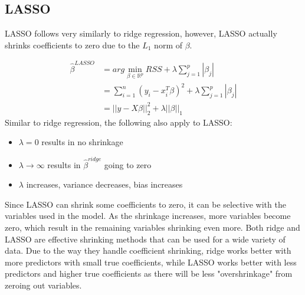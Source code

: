 \documentclass[11pt]{article}
\begin{document}
\subsection{LASSO}
LASSO follows very similarly to ridge regression, however, LASSO actually shrinks coefficients to zero due to the $L_1$ norm of $\beta$. 

\begin{align}\nonumber
\hat{\beta}^{LASSO} &= arg\min_{\beta \in \mathbb{R}^p} RSS + \lambda\sum_{j=1}^p|\beta_j|\\\nonumber
&= \sum_{i=1}^n(y_i - x_i^T\beta)^2 + \lambda\sum_{j=1}^p|\beta_j| \\ 
&= ||y - X\beta||_2^2 + \lambda||\beta||_1
\end{align}
Similar to ridge regression, the following also apply to LASSO:
\begin{itemize}
\item $\lambda = 0$ results in no shrinkage
\item $\lambda \rightarrow \infty$ results in $\hat{\beta}^{ridge}$ going to zero 
\item $\lambda$ increases, variance decreases, bias increases
\end{itemize}
Since LASSO can shrink some coefficients to zero, it can be selective with the variables used in the model. As the shrinkage increases, more variables become zero, which result in the remaining variables shrinking even more. Both ridge and LASSO are effective shrinking methods that can be used for a wide variety of data. Due to the way they handle coefficient shrinking, ridge works better with more predictors with small true coefficients, while LASSO works better with less predictors and higher true coefficients as there will be less "overshrinkage" from zeroing out variables. 
\end{document}
